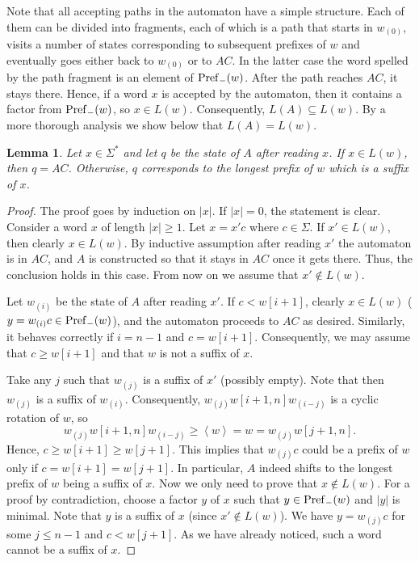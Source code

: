 \documentclass{article}
\newcommand{\mayqed}{}
\newcommand{\minrot}[1]{\left\langle #1 \right\rangle}
\newtheorem{lemma}[theorem]{Lemma}
\theoremstyle{definition}
\theoremstyle{remark}
\begin{document}
Note that all accepting paths in the automaton have a simple structure.
Each of them can be divided into fragments, each of which is a path that starts in $w_{(0)}$,
visits a number of states corresponding to subsequent prefixes of $w$ and eventually goes either back to $w_{(0)}$ or to $AC$.
In the latter case the word spelled by the path fragment is an element of $\mathrm{Pref}_{-}(w)$.
After the path reaches $AC$, it stays there.
Hence, if a word $x$ is accepted by the automaton, then it contains a factor from $\mathrm{Pref}_{-}(w)$, so $x \in L(w)$.
Consequently, $L(A) \subseteq L(w)$.
By a more thorough analysis we show below that $L(A)=L(w)$.
\begin{lemma}
  Let $x\in \Sigma^*$ and let $q$ be the state of $A$ after reading $x$.
  If $x\in L(w)$, then $q=AC$. Otherwise, $q$ corresponds to the longest prefix of $w$
  which is a suffix of $x$.
\end{lemma}
\begin{proof}
  The proof goes by induction on $|x|$.
  If $|x|=0$, the statement is clear.
  Consider a word $x$ of length $|x| \ge 1$. Let $x=x'c$ where $c\in \Sigma$.
  If $x'\in L(w)$, then clearly $x\in L(w)$. By inductive assumption after reading $x'$ the automaton
  is in $AC$, and $A$ is constructed so that it stays in $AC$ once it gets there.
  Thus, the conclusion holds in this case.
  From now on we assume that $x'\notin L(w)$.

  Let $w_{(i)}$ be the state of $A$ after reading $x'$. If $c < w[i+1]$, clearly $x\in L(w)$
  ($y=w_{(i)}c \in \mathrm{Pref}_{-}(w)$), and the automaton proceeds to $AC$ as desired.
  Similarly, it behaves correctly if $i=n-1$ and $c=w[i+1]$.
  Consequently, we may assume that $c\ge w[i+1]$ and that $w$ is not a suffix of $x$.

  Take any $j$ such that $w_{(j)}$ is a suffix of $x'$ (possibly empty).
  Note that then $w_{(j)}$ is a suffix of $w_{(i)}$. 
  Consequently, $w_{(j)}w[i+1,n]w_{(i-j)}$ is a cyclic rotation of $w$,
  so
  $$w_{(j)}w[i+1,n]w_{(i-j)}\ge \minrot{w}=w=w_{(j)}w[j+1,n].$$
  Hence, $c \ge w[i+1]\ge w[j+1]$.
  This implies that $w_{(j)}c$
  could be a prefix of $w$ only if $c=w[i+1]=w[j+1]$.
  In particular, $A$ indeed shifts to the longest prefix of $w$ being a suffix of $x$.
  Now we only need to prove that $x\notin L(w)$.
  For a proof by contradiction, choose a factor $y$ of $x$ such that $y\in \mathrm{Pref}_{-}(w)$ and $|y|$ is minimal.
  Note that $y$ is a suffix of $x$ (since $x'\notin L(w)$). We have $y=w_{(j)}c$ for some $j\le n-1$
  and $c<w[j+1]$. As we have already noticed, such a word cannot be a suffix of $x$.
\mayqed\end{proof}
\end{document}
